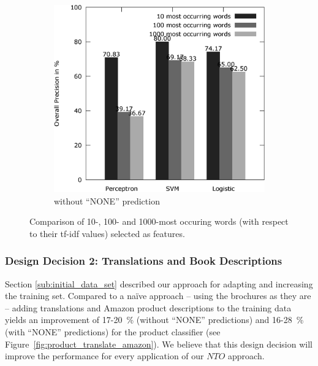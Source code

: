 \begin{figure}[h!]
\begin{subfigure}[t]{0.5\textwidth}
		\includegraphics[width=\textwidth]{figures/product_feature_selection_without_none.eps}
		\caption{without ``NONE'' prediction}
	\end{subfigure}
	\caption{Comparison of 10-, 100- and 1000-most occuring words (with respect to their tf-idf values) selected as features.}
	\label{fig:product_feature_selection}
\end{figure}

\subsubsection{Design Decision 2: Translations and Book Descriptions}
Section \ref{sub:initial_data_set} described our approach for adapting and increasing the training set.
Compared to a na\"ive approach -- using the brochures as they are -- adding translations and Amazon product descriptions to the training data yields an improvement of 17-20~\% (without ``NONE'' predictions) and 16-28~\% (with ``NONE'' predictions) for the product classifier (see Figure~\ref{fig:product_translate_amazon}).
We believe that this design decision will improve the performance for every application of our $NTO$ approach.

